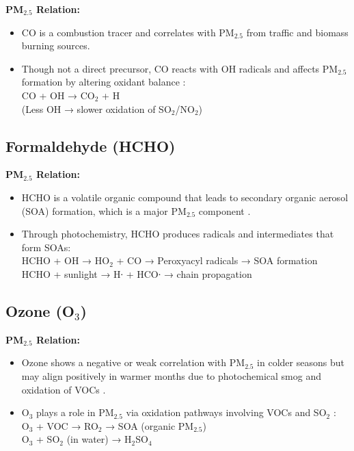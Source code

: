 \documentclass[12pt]{report}
\begin{document}
\noindent\textbf{PM$_{2.5}$ Relation:}

\begin{itemize}
    \item CO is a combustion tracer and correlates with PM$_{2.5}$ from traffic and biomass burning sources.
    
    \item Though not a direct precursor, CO reacts with OH radicals and affects PM$_{2.5}$ formation by altering oxidant balance \cite{carbon}: \\
    \quad \quad CO + OH → CO$_2$ + H \\
    \quad \quad (Less OH → slower oxidation of SO$_2$/NO$_2$)
\end{itemize}


\subsection*{Formaldehyde (HCHO)}

\noindent\textbf{PM$_{2.5}$ Relation:}

\begin{itemize}
    \item HCHO is a volatile organic compound that leads to secondary organic aerosol (SOA) formation, which is a major PM$_{2.5}$ component \cite{hcho}.
    
    \item Through photochemistry, HCHO produces radicals and intermediates that form SOAs: \\
    \quad \quad HCHO + OH → HO$_2$ + CO → Peroxyacyl radicals → SOA formation \\
    \quad \quad HCHO + sunlight → H∙ + HCO∙ → chain propagation
\end{itemize}


\subsection*{Ozone (O$_3$)}

\noindent\textbf{PM$_{2.5}$ Relation:}

\begin{itemize}
    \item Ozone shows a negative or weak correlation with PM$_{2.5}$ in colder seasons but may align positively in warmer months due to photochemical smog and oxidation of VOCs \cite{ozone1}.
    
    \item O$_3$ plays a role in PM$_{2.5}$ via oxidation pathways involving VOCs and SO$_2$ \cite{ozone2}: \\
    \quad \quad O$_3$ + VOC → RO$_2$ → SOA (organic PM$_{2.5}$) \\
    \quad \quad O$_3$ + SO$_2$ (in water) → H$_2$SO$_4$ 
\end{itemize}
\end{document}
